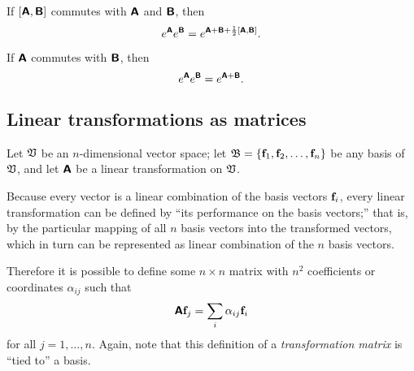 If $[\textsf{\textbf{A}},\textsf{\textbf{B}}]$ commutes with $\textsf{\textbf{A}}$ and
$\textsf{\textbf{B}}$, then
 \begin{equation}
 e^\textsf{\textbf{A}}e^\textsf{\textbf{B}}=
e^{\textsf{\textbf{A}}+\textsf{\textbf{B}}+{1\over 2}\left[\textsf{\textbf{A}},\textsf{\textbf{B}}\right]}.
 \end{equation}

If  $\textsf{\textbf{A}}$ commutes with $\textsf{\textbf{B}}$, then
 \begin{equation}
 e^\textsf{\textbf{A}}e^\textsf{\textbf{B}}=
e^{\textsf{\textbf{A}}+\textsf{\textbf{B}}}.
 \end{equation}

\subsection{Linear transformations as matrices}



Let ${\frak V}$ be an $n$-dimensional vector space;
let
${\frak B}=\{{\bf f}_1,{\bf f}_2,\ldots ,{\bf f}_n\}$ be any basis of ${\frak V}$,
and let  $\textsf{\textbf{A}}$ be a linear transformation on ${\frak V}$.

Because every vector is a linear combination of the basis vectors
${\bf f}_i$,
every linear transformation can be defined by
``its performance on the basis vectors;'' that is,
by the particular mapping of
all $n$ basis vectors into the transformed vectors, which in turn can be represented as linear combination of the $n$ basis vectors.

Therefore it is possible to define some $n \times n$ matrix with $n^2$ coefficients or coordinates
$\alpha_{ij}$ such that
\begin{equation}
\textsf{\textbf{A}} {\bf f}_j = \sum_i \alpha_{ij}{\bf f}_i
\label{2015-m-ch-fdlvs-dtlt}
\end{equation}
for all $j=1,\ldots ,n$.
Again, note that this definition of a {\em transformation matrix}
is ``tied to'' a basis.

